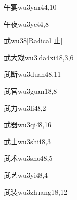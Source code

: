 \begin{verbete}{午宴}{wu3yan4}{4,10}
\end{verbete}

\begin{verbete}{午夜}{wu3ye4}{4,8}
\end{verbete}

\begin{verbete}{武}{wu3}{8}[Radical 止]
\end{verbete}

\begin{verbete}{武大戏}{wu3 da4xi4}{8,3,6}
\end{verbete}

\begin{verbete}{武断}{wu3duan4}{8,11}
\end{verbete}

\begin{verbete}{武官}{wu3guan1}{8,8}
\end{verbete}

\begin{verbete}{武力}{wu3li4}{8,2}
\end{verbete}

\begin{verbete}{武器}{wu3qi4}{8,16}
\end{verbete}

\begin{verbete}{武士}{wu3shi4}{8,3}
\end{verbete}

\begin{verbete}{武术}{wu3shu4}{8,5}
\end{verbete}

\begin{verbete}{武艺}{wu3yi4}{8,4}
\end{verbete}

\begin{verbete}{武装}{wu3zhuang1}{8,12}
\end{verbete}

